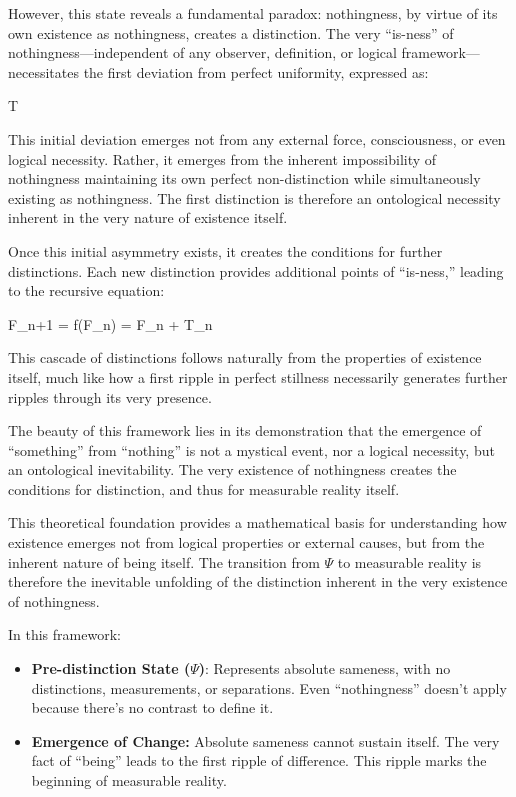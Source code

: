 \documentclass{article}
\let\oldequation\equation
\let\endoldequation\endequation
\renewenvironment{equation}{%
    \noindent\vspace{-\parskip}\vspace{-\baselineskip}%
    \oldequation
}{%
    \endoldequation
    \noindent\vspace{-\parskip}\vspace{-\baselineskip}%
}
\theoremstyle{definition}
\begin{document}
However, this state reveals a fundamental paradox: nothingness, by virtue of its own existence as nothingness, creates a distinction. The very ``is-ness'' of nothingness---independent of any observer, definition, or logical framework---necessitates the first deviation from perfect uniformity, expressed as:

\begin{equation}
\Delta T 
\end{equation}

This initial deviation emerges not from any external force, consciousness, or even logical necessity. Rather, it emerges from the inherent impossibility of nothingness maintaining its own perfect non-distinction while simultaneously existing as nothingness. The first distinction is therefore an ontological necessity inherent in the very nature of existence itself.

Once this initial asymmetry exists, it creates the conditions for further distinctions. Each new distinction provides additional points of ``is-ness,'' leading to the recursive equation:

\begin{equation}
F_{n+1} = f(F_n) = F_n + \Delta T_n
\end{equation}

This cascade of distinctions follows naturally from the properties of existence itself, much like how a first ripple in perfect stillness necessarily generates further ripples through its very presence.

The beauty of this framework lies in its demonstration that the emergence of ``something'' from ``nothing'' is not a mystical event, nor a logical necessity, but an ontological inevitability. The very existence of nothingness creates the conditions for distinction, and thus for measurable reality itself.

This theoretical foundation provides a mathematical basis for understanding how existence emerges not from logical properties or external causes, but from the inherent nature of being itself. The transition from $\Psi$ to measurable reality is therefore the inevitable unfolding of the distinction inherent in the very existence of nothingness.

In this framework:

\begin{itemize}
\item \textbf{Pre-distinction State ($\Psi$)}: Represents absolute sameness, with no distinctions, measurements, or separations. Even \enquote{nothingness} doesn't apply because there's no contrast to define it.
\item \textbf{Emergence of Change:} Absolute sameness cannot sustain itself. The very fact of \enquote{being} leads to the first ripple of difference. This ripple marks the beginning of measurable reality.
\end{itemize}
\end{document}
